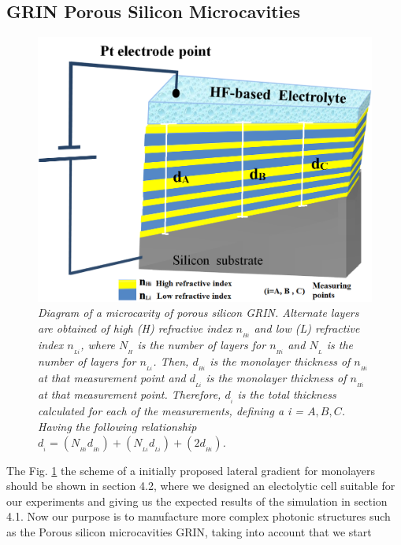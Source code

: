 \documentclass{article}
\begin{document}
\subsection{GRIN Porous Silicon Microcavities}
 \begin{figure}
	\centering
	\includegraphics[scale=0.4]{Images/MicrGrin}
	\caption{\emph{Diagram of a microcavity of porous silicon
            GRIN. Alternate layers are obtained of high (H) refractive
            index $n_{_{Hi}}$ and low (L) refractive index
            $n_{_{Li}}$, where $N_{_{H}}$ is the number of layers for
            $n_{_{Hi}}$ and $N_{_{L}}$ is the number of layers for
            $n_{_{Li}}$. Then,  $d_{_{Hi}}$ is the monolayer thickness
            of  $n_{_{Hi}}$ at that measurement point and $d_{_{Li}}$
            is the monolayer thickness of $n_{_{Hi}}$ at that
            measurement point. Therefore,  $d_{_{i}}$ is the total
            thickness calculated for each of the measurements,
            defining a i = $ A, B, C$. Having the following
            relationship $d_{_{i}} =
            (N_{_{Hi}}d_{_{Hi}})+(N_{_{Li}}d_{_{Li}}) +
            (2d_{_{Hi}})$. }}
	\label{fig:MCGRIN0}
\end{figure}
The Fig. \ref{fig:MCGRIN0} the scheme of  a initially proposed lateral
gradient for monolayers should be shown in section 4.2, where we
designed an electolytic cell suitable for our experiments and giving
us the expected results of the simulation in section 4.1. Now our
purpose is to manufacture more complex photonic structures such as the
Porous silicon microcavities GRIN, taking into account that we start
\end{document}
